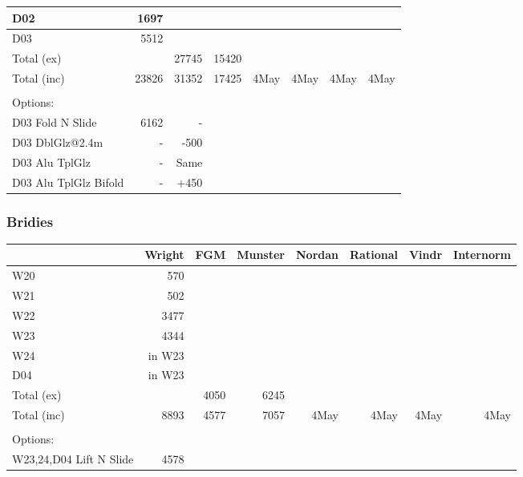 \begin{tabular}{|p{4cm}||r|r|r|r|r|r|r|}
\\ \hline
D02         &1697       &          &        &        &           &       &                     
\\ \hline
D03         &5512       &          &        &        &           &       &                     
\\ \hline
Total (ex)  &           &27745     &15420   &        &           &       &               
\\ \hline
Total (inc) &23826      &31352     &17425   &4May    &4May       &4May   &4May             
\\ \hline
\\ \hline
Options: 
\\ \hline
D03 Fold N Slide        &6162      &-      &           &       &           &       &         
\\ \hline
D03 DblGlz@2.4m         &-         &-500   &           &       &           &       &
\\ \hline
D03 Alu TplGlz          &-         &Same   &           &       &           &       &
\\ \hline
D03 Alu TplGlz Bifold   &-         &+450   &           &       &           &       & 
\\ \hline

\end{tabular}

\subsubsection{Bridies}
\begin{tabular}{|p{4cm}||r|r|r|r|r|r|r|}
\hline
            &Wright &FGM  &Munster &Nordan &Rational &Vindr &Internorm
\\ \hline
W20         &570    &     &        &       &         &      &               
\\ \hline
W21         &502    &     &        &       &         &      &      
\\ \hline
W22         &3477   &     &        &       &         &      &        
\\ \hline
W23         &4344   &     &        &       &         &      &       
\\ \hline
W24         &in W23 &     &        &       &         &      &       
\\ \hline
D04         &in W23 &     &        &       &         &      &         
\\ \hline
Total (ex)  &       &4050 &6245      
\\ \hline
Total (inc) & 8893  &4577 &7057    &4May   &4May     &4May  &4May   
\\ \hline
\\ \hline
Options: 
\\ \hline
W23,24,D04 Lift N Slide  &4578      &       &           &       &           &      & 
\\ \hline
\end{tabular}
